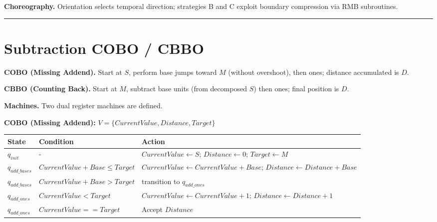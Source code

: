 \documentclass[12pt]{book}
\begin{document}
\textbf{Choreography.} Orientation selects temporal direction;
strategies B and C exploit boundary compression via RMB subroutines.

\begin{center}\rule{0.5\linewidth}{0.5pt}\end{center}

\section{Subtraction COBO / CBBO}\label{subtraction-cobo-cbbo}

\textbf{COBO (Missing Addend).} Start at \(S\), perform base jumps
toward \(M\) (without overshoot), then ones; distance accumulated is
\(D\).

\textbf{CBBO (Counting Back).} Start at \(M\), subtract base units (from
decomposed \(S\)) then ones; final position is \(D\).

\textbf{Machines.} Two dual register machines are defined.

\textbf{COBO (Missing Addend):}
\(V = \{CurrentValue, Distance, Target\}\)

\begin{longtable}[]{@{}
  >{\raggedright\arraybackslash}p{}
  >{\raggedright\arraybackslash}p{}
  >{\raggedright\arraybackslash}p{}@{}}
\toprule\noalign{}
\begin{minipage}[b]{\linewidth}\raggedright
State
\end{minipage} & \begin{minipage}[b]{\linewidth}\raggedright
Condition
\end{minipage} & \begin{minipage}[b]{\linewidth}\raggedright
Action
\end{minipage} \\
\midrule\noalign{}
\endhead
\bottomrule\noalign{}
\endlastfoot
\(q_{init}\) & - & \(CurrentValue \leftarrow S\);
\(Distance \leftarrow 0\); \(Target \leftarrow M\) \\
\(q_{add\_bases}\) & \(CurrentValue + Base \le Target\) &
\(CurrentValue \leftarrow CurrentValue + Base\);
\(Distance \leftarrow Distance + Base\) \\
\(q_{add\_bases}\) & \(CurrentValue + Base > Target\) & transition to
\(q_{add\_ones}\) \\
\(q_{add\_ones}\) & \(CurrentValue < Target\) &
\(CurrentValue \leftarrow CurrentValue + 1\);
\(Distance \leftarrow Distance + 1\) \\
\(q_{add\_ones}\) & \(CurrentValue == Target\) & Accept \(Distance\) \\
\end{longtable}
\end{document}
